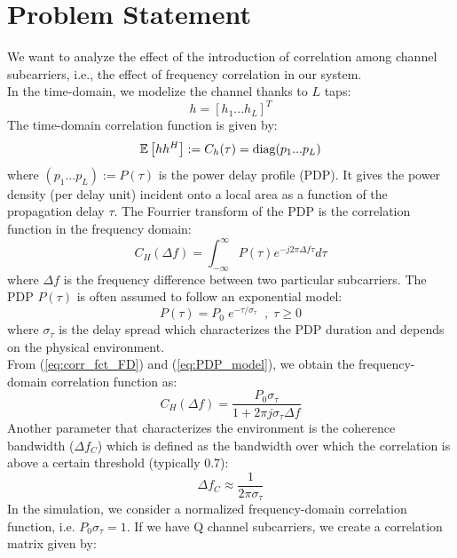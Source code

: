 \documentclass[12pt]{article}
\begin{document}
\section{Problem Statement}
We want to analyze the effect of the introduction of correlation among channel subcarriers, i.e., the effect of frequency correlation in our system. \\
In the time-domain, we modelize the channel thanks to $L$ taps:
\begin{equation}
	h = [h_1 ... h_L]^T
	\label{eq:channel_TD}
\end{equation}
The time-domain correlation function is given by:
\begin{equation}
	\mathbb{E} \left[h h^H\right] := C_h(\tau) = \text{diag}(p_1 ... p_L)
	\label{eq:corr_fct_TD}
\end{equation}
where $(p_1 ... p_L) := P(\tau)$ is the power delay profile (PDP). It gives the power density (per delay unit) incident onto a local area as a function of the propagation delay $\tau$. The Fourrier transform of the PDP is the correlation function in the frequency domain:
\begin{equation}
 C_H(\Delta f) = \int_{-\infty}^{\infty} P(\tau) e^{-j 2\pi \Delta f \tau} d\tau
\label{eq:corr_fct_FD}
\end{equation}
where $\Delta f$ is the frequency difference between two particular subcarriers. The PDP $P(\tau)$ is often assumed to follow an exponential model:
\begin{equation}
	P(\tau) = P_0 \; e^{-\tau/\sigma_\tau}  \; \; , \; \tau \geq 0
	\label{eq:PDP_model}
\end{equation}
where $\sigma_\tau$ is the delay spread which characterizes the PDP duration and depends on the physical environment.\\
From (\ref{eq:corr_fct_FD}) and (\ref{eq:PDP_model}), we obtain the frequency-domain correlation function as:
\begin{equation}
	C_H(\Delta f) = \frac{P_0 \sigma_\tau}{1+ 2\pi j \sigma_\tau \Delta f}
	\label{eq:correl_fct}
\end{equation}
Another parameter that characterizes the environment is the coherence bandwidth ($\Delta f_C$) which is defined as the bandwidth over which the correlation is above a certain threshold (typically 0.7):
\begin{equation}
	\Delta f_C \approx \frac{1}{2\pi\sigma_\tau}
	\label{eq:coherence_bw}
\end{equation}
In the simulation, we consider a normalized frequency-domain correlation function, i.e. $P_0 \sigma_\tau = 1$. If we have Q channel subcarriers, we create a correlation matrix given by:
\end{document}
